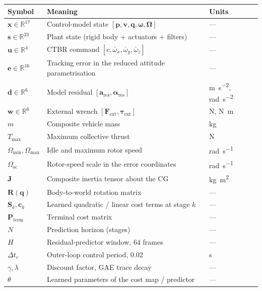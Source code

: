 \documentclass[11pt,a4paper,twoside,openright]{report}
\makeatletter
\renewcommand{\subsection}{\FloatBarrier\old@subsection}}
\newcommand{\vH}{64}                     %
\newcommand{\R}{\mathbb{R}}
\renewcommand{\vec}[1]{\bm{#1}}
\newcommand{\mat}[1]{\bm{#1}}
\newcommand{\ctrlstate}{\vec{x}}
\newcommand{\plantstate}{\vec{s}}
\newcommand{\inp}{\vec{u}}
\newcommand{\err}{\vec{e}}
\newcommand{\dres}{\vec{d}}
\newcommand{\wrench}{\vec{w}}
\newcommand{\quat}{\vec{q}}
\newcommand{\bodyrate}{\vec{\omega}}
\theoremstyle{plain}
\theoremstyle{definition}
\theoremstyle{remark}
\makeatother
\begin{document}
	\vspace{-4mm}
	\subsection*{Principal symbols}
	\begin{longtable}{@{}p{26mm}p{88mm}p{22mm}@{}}
		\toprule
		\textbf{Symbol} & \textbf{Meaning} & \textbf{Units} \\
		\midrule
		\endhead
		$\ctrlstate\in\R^{17}$ & Control-model state $[\vec p,\vec v,\quat,\bodyrate,\vec\Omega]$ & --- \\
		$\plantstate\in\R^{23}$ & Plant state (rigid body $+$ actuators $+$ filters) & --- \\
		$\inp\in\R^{4}$ & CTBR command $[c,\bar\omega_x,\bar\omega_y,\bar\omega_z]$ & --- \\
		$\err\in\R^{16}$ & Tracking error in the reduced attitude parametrisation & --- \\
		$\dres\in\R^{6}$ & Model residual $[\vec a_\mathrm{res},\vec\alpha_\mathrm{res}]$ & \si{\metre\per\square\second}, \si{\radian\per\square\second} \\
		$\wrench\in\R^{6}$ & External wrench $[\vec F_\mathrm{ext},\vec\tau_\mathrm{ext}]$ & \si{\newton}, \si{\newton\metre} \\
		$m$ & Composite vehicle mass & \si{\kilogram} \\
		$T_{\max}$ & Maximum collective thrust & \si{\newton} \\
		$\Omega_{\min},\Omega_{\max}$ & Idle and maximum rotor speed & \si{\radian\per\second} \\
		$\Omega_\mathrm{sc}$ & Rotor-speed scale in the error coordinates & \si{\radian\per\second} \\
		$\mat J$ & Composite inertia tensor about the CG & \si{\kilogram\square\metre} \\
		$\mat R(\quat)$ & Body-to-world rotation matrix & --- \\
		$\mat S_k,\vec c_k$ & Learned quadratic / linear cost terms at stage $k$ & --- \\
		$\mat P_\mathrm{term}$ & Terminal cost matrix & --- \\
		$N$ & Prediction horizon (stages) & --- \\
		$H$ & Residual-predictor window, $\vH$ frames & --- \\
		$\Delta t_c$ & Outer-loop control period, \num{0.02} & \si{\second} \\
		$\gamma,\lambda$ & Discount factor, GAE trace decay & --- \\
		$\theta$ & Learned parameters of the cost map / predictor & --- \\
		\bottomrule
	\end{longtable}
\end{document}
